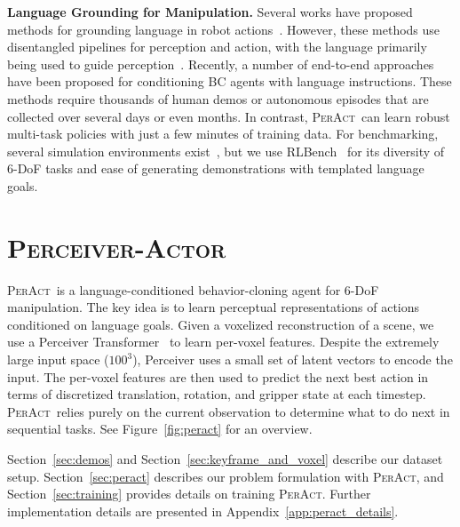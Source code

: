 \documentclass{article}
\newcommand{\secref}[1]{Section~\ref{#1}}
\newcommand{\appsecref}[1]{Appendix~\ref{#1}}
\newcommand{\figref}[1]{Figure~\ref{#1}}
\newcommand{\model}{\textsc{PerAct}}
\newcommand{\modelfullns}{\textsc{Perceiver-Actor}}
\newcommand{\modelfull}{\textsc{\modelfullns~}}
\begin{document}
\textbf{Language Grounding for Manipulation.} Several works have proposed methods for grounding language in robot actions~\citep{Shridhar-RSS-18,matuszek2014learning,bollini2013interpreting,misra2016tell,bisk2016natural,thomason2015learning,interact_picking18,chenJointNetworkGrasp2021, blukis2020few, paxton2019prospection,tellex2011understanding,nguyen2020robot}. However, these methods use disentangled pipelines for perception and action, with the language primarily being used to guide perception~\citep{egl}. 
Recently, a number of end-to-end approaches \citep{ahn2022can,jang2022bc,nair2022learning,mees2022matters,lynch2020grounding} have been proposed for conditioning BC agents with language instructions. These methods require thousands of human demos or autonomous episodes that are collected over several days or even months. In contrast, \model~can learn robust multi-task policies with just a few minutes of training data. For benchmarking, several simulation environments exist~\citep{mees2021calvin,zengTransporterNetworksRearranging2021,yu2020meta}, but we use RLBench~\citep{james2020rlbench} for its diversity of 6-DoF tasks and ease of generating demonstrations with templated language goals. 

\section{\modelfull}

\model~is a language-conditioned behavior-cloning agent for 6-DoF manipulation. The key idea is to learn perceptual representations of actions conditioned on language goals. Given a voxelized reconstruction of a scene, we use a Perceiver Transformer~\citep{jaegle2021perceiver} to learn per-voxel features. Despite the extremely large input space ($100^3$), Perceiver uses a small set of latent vectors to encode the input. The per-voxel features are then used to predict the next best action in terms of discretized translation, rotation, and gripper state at each timestep. \model~relies purely on the current observation to determine what to do next in sequential tasks. 
See \figref{fig:peract} for an overview. 


\secref{sec:demos} and \secref{sec:keyframe_and_voxel} describe our dataset setup. \secref{sec:peract} describes our problem formulation with \model, and \secref{sec:training} provides details on training \model. Further implementation details are presented in \appsecref{app:peract_details}. 
\end{document}
